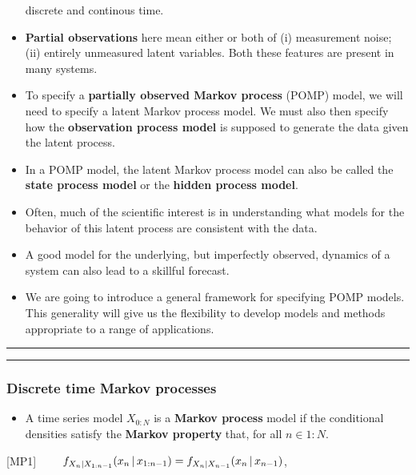 \documentclass[]{article}
\providecommand{\tightlist}{%
  \setlength{\itemsep}{0pt}\setlength{\parskip}{0pt}}
\begin{document}
\begin{itemize}
  discrete and continous time.
\item
  \textbf{Partial observations} here mean either or both of (i)
  measurement noise; (ii) entirely unmeasured latent variables. Both
  these features are present in many systems.
\item
  To specify a \textbf{partially observed Markov process} (POMP) model,
  we will need to specify a latent Markov process model. We must also
  then specify how the \textbf{observation process model} is supposed to
  generate the data given the latent process.
\item
  In a POMP model, the latent Markov process model can also be called
  the \textbf{state process model} or the \textbf{hidden process model}.
\item
  Often, much of the scientific interest is in understanding what models
  for the behavior of this latent process are consistent with the data.
\item
  A good model for the underlying, but imperfectly observed, dynamics of
  a system can also lead to a skillful forecast.
\item
  We are going to introduce a general framework for specifying POMP
  models. This generality will give us the flexibility to develop models
  and methods appropriate to a range of applications.
\end{itemize}

\begin{center}\rule{0.5\linewidth}{\linethickness}\end{center}

\begin{center}\rule{0.5\linewidth}{\linethickness}\end{center}

\subsubsection{Discrete time Markov
processes}\label{discrete-time-markov-processes}

\begin{itemize}
\tightlist
\item
  A time series model \(X_{0:N}\) is a \textbf{Markov process} model if
  the conditional densities satisfy the \textbf{Markov property} that,
  for all \(n\in 1:N\).
\end{itemize}

{[}MP1{]}
\(\quad\quad f_{X_n|X_{1:n-1}}(x_n{\, | \,} x_{1:n-1}) = f_{X_n|X_{n-1}}(x_n{\, | \,} x_{n-1})\),
\end{document}
